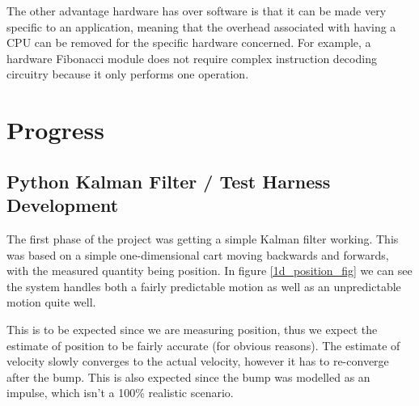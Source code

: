 \documentclass[12pt]{article}
\begin{document}
The other advantage hardware has over software is that it can be made very specific to an application, meaning that the overhead associated with having a CPU can be removed for the specific hardware concerned. For example, a hardware Fibonacci module does not require complex instruction decoding circuitry because it only performs one operation.

\section{Progress}

\subsection{Python Kalman Filter / Test Harness Development}
The first phase of the project was getting a simple Kalman filter working. This was based on a simple one-dimensional cart moving backwards and forwards, with the measured quantity being position. In figure \ref{1d_position_fig} we can see the system handles both a fairly predictable motion as well as an unpredictable motion quite well. 

This is to be expected since we are measuring position, thus we expect the estimate of position to be fairly accurate (for obvious reasons). The estimate of velocity slowly converges to the actual velocity, however it has to re-converge after the bump. This is also expected since the bump was modelled as an impulse, which isn't a 100\% realistic scenario.
\end{document}

